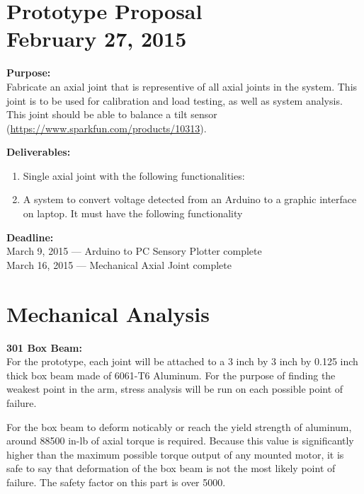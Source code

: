 \documentclass[11pt]{article}
\begin{document}
\section{Prototype Proposal \\ February 27, 2015}
\noindent \textbf{Purpose:}\\
\indent Fabricate an axial joint that is representive of all axial joints in the system. This joint is to be used for calibration and load testing, as well as system analysis.\\
\indent This joint should be able to balance a tilt sensor (\url{https://www.sparkfun.com/products/10313}).

\noindent \textbf{Deliverables:}
\begin{enumerate}
	\item Single axial joint with the following functionalities:
	\item A system to convert voltage detected from an Arduino to a graphic interface on laptop. It must have the following functionality
\end{enumerate}

\noindent \textbf{Deadline:}\\
March 9, 2015 --- Arduino to PC Sensory Plotter complete\\
March 16, 2015 --- Mechanical Axial Joint complete\\

\section{Mechanical Analysis}
\noindent \textbf{301 Box Beam:}\\
\indent For the prototype, each joint will be attached to a 3 inch by 3 inch by 0.125 inch thick box beam made of 6061-T6 Aluminum. For the purpose of finding the weakest point in the arm, stress analysis will be run on each possible point of failure.

For the box beam to deform noticably or reach the yield strength of aluminum, around 88500 in-lb of axial torque is required. Because this value is significantly higher than the maximum possible torque output of any mounted motor, it is safe to say that deformation of the box beam is not the most likely point of failure. The safety factor on this part is over 5000.
\end{document}
